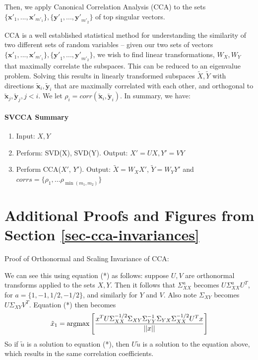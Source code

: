 \documentclass{article} %
\newcommand{\argmax}{\operatornamewithlimits{argmax}}
\begin{document}
Then, we apply Canonical Correlation Analysis (CCA) to the sets $\{ {\pmb{x'}}_1,..., {\pmb{x'}}_{m'_1} \},  \{ {\pmb{y'}}_1,..., {\pmb{y'}}_{m'_2} \} $ of top singular vectors.

CCA is a well established statistical method for understanding the similarity of two different sets of random variables -- given our two sets of vectors $\{ {\pmb{x'}}_1,..., {\pmb{x'}}_{m'_1} \}, \{ {\pmb{y'}}_1,..., {\pmb{y'}}_{m'_2} \} $, we wish to find linear transformations, $W_X, W_Y$ that maximally correlate the subspaces. This can be reduced to an eigenvalue problem. Solving this results in linearly transformed subspaces $\tilde{X}, \tilde{Y}$ with directions $\tilde{\pmb{x}}_i, \tilde{\pmb{y}}_i$ that are maximally correlated with each other, and orthogonal to $\tilde{\pmb{x}}_j , \tilde{\pmb{y}}_j, j < i$. We let $\rho_i = corr(\tilde{\pmb{x}}_i, \tilde{\pmb{y}}_i)$. In summary, we have:
 

\paragraph{SVCCA Summary}
\begin{enumerate}
    \item Input: $X, Y$
    \item Perform: SVD(X), SVD(Y). Output: ${X'} = UX, {Y'} = VY$
    \item Perform CCA(${X'}$, ${Y'}$). Output: $\tilde{X}= W_X{X'}$, $\tilde{Y} = W_Y{Y'}$ and $corrs = \{\rho_1, \dots \rho_{\min(m_1, m_2)} \}$
\end{enumerate}


\section{Additional Proofs and Figures from Section \ref{sec-cca-invariances}}
\label{app-invariances}

Proof of Orthonormal and Scaling Invariance of CCA:

We can see this using equation (*) as follows: suppose $U, V$ are orthonormal transforms applied to the sets $X, Y$. Then it follows that $\Sigma^a_{XX}$ becomes $U \Sigma^a_{XX} U^T$, for $a = \{1, -1, 1/2, -1/2\}$, and similarly for $Y$ and $V$. Also note $\Sigma_{XY}$ becomes $U \Sigma_{XY} V^T$. Equation (*) then becomes
\[ \tilde{x}_1 = \argmax \left[ \frac{ x^T U \Sigma_{XX}^{-1/2}\Sigma_{XY}\Sigma_{YY}^{-1}\Sigma_{YX} \Sigma_{XX}^{-1/2}U^T x}{ ||x||} \right]  \]
So if $\tilde{u}$ is a solution to equation (*), then $U\tilde{u}$ is a solution to the equation above, which results in the same correlation coefficients.
\end{document}

